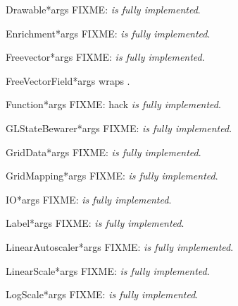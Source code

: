 \documentclass{manual}
\begin{document}
\begin{classdesc}{Drawable}{*args}
FIXME: \emph{is fully implemented}.
\end{classdesc}

\begin{classdesc}{Enrichment}{*args}
FIXME: \emph{is fully implemented}.
\end{classdesc}

\begin{classdesc}{Freevector}{*args}
FIXME: \emph{is fully implemented}.
\end{classdesc}

\begin{classdesc}{FreeVectorField}{*args}
wraps .
\end{classdesc}

\begin{classdesc}{Function}{*args}
FIXME: hack \emph{is fully implemented}.
\end{classdesc}

\begin{classdesc}{GLStateBewarer}{*args}
FIXME: \emph{is fully implemented}.
\end{classdesc}

\begin{classdesc}{GridData}{*args}
FIXME: \emph{is fully implemented}.
\end{classdesc}

\begin{classdesc}{GridMapping}{*args}
FIXME: \emph{is fully implemented}.
\end{classdesc}

\begin{classdesc}{IO}{*args}
FIXME: \emph{is fully implemented}.
\end{classdesc}

\begin{classdesc}{Label}{*args}
FIXME: \emph{is fully implemented}.
\end{classdesc}

\begin{classdesc}{LinearAutoscaler}{*args}
FIXME: \emph{is fully implemented}.
\end{classdesc}

\begin{classdesc}{LinearScale}{*args}
FIXME: \emph{is fully implemented}.
\end{classdesc}

\begin{classdesc}{LogScale}{*args}
FIXME: \emph{is fully implemented}.
\end{classdesc}
\end{document}

